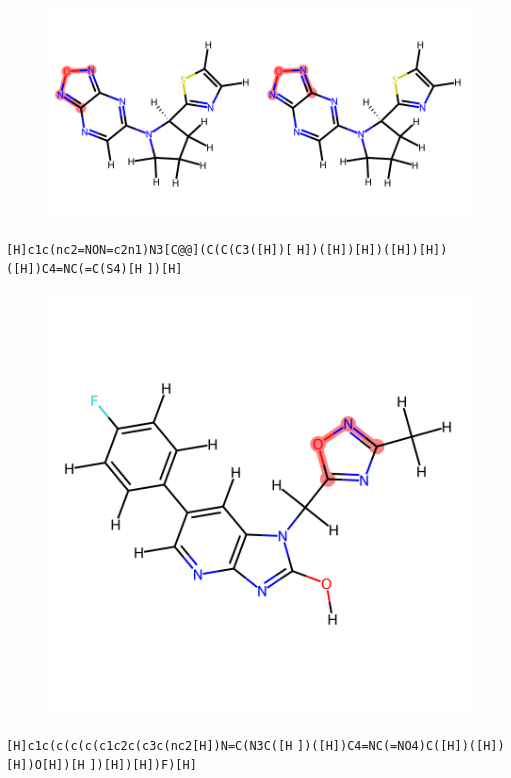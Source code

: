\documentclass{article}
\begin{document}
\begin{figure}[ht]
\centering
    \includegraphics{mol258.png}
\end{figure}
\verb|[H]c1c(nc2=NON=c2n1)N3[C@@](C(C(C3([H])[| \verb|H])([H])[H])([H])[H])([H])C4=NC(=C(S4)[H| \verb|])[H]|

\begin{figure}[ht]
\centering
    \includegraphics{mol259.png}
\end{figure}
\verb|[H]c1c(c(c(c(c1c2c(c3c(nc2[H])N=C(N3C([H| \verb|])([H])C4=NC(=NO4)C([H])([H])[H])O[H])[H| \verb|])[H])[H])F)[H]|
\end{document}
